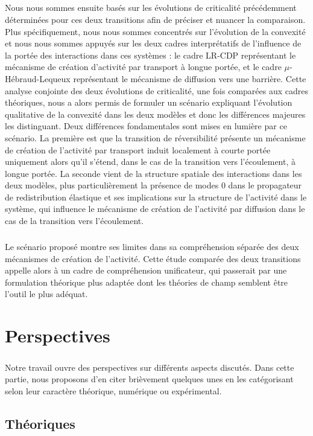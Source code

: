 \subparagraph{}Nous nous sommes ensuite basés sur les évolutions de criticalité précédemment déterminées pour ces deux transitions afin de préciser et nuancer la comparaison. Plus spécifiquement, nous nous sommes concentrés sur l'évolution de la convexité et nous nous sommes appuyés sur les deux cadres interprétatifs de l'influence de la portée des interactions dans ces systèmes : le cadre LR-CDP représentant le mécanisme de création d'activité par transport à longue portée, et le cadre $\mu$-Hébraud-Lequeux représentant le mécanisme de diffusion vers une barrière. Cette analyse conjointe des deux évolutions de criticalité, une fois comparées aux cadres théoriques, nous a alors permis de formuler un scénario expliquant l'évolution qualitative de la convexité dans les deux modèles et donc les différences majeures les distinguant. Deux différences fondamentales sont mises en lumière par ce scénario. La première est que la transition de réversibilité présente un mécanisme de création de l'activité par transport induit localement à courte portée uniquement alors qu'il s'étend, dans le cas de la transition vers l'écoulement, à longue portée. La seconde vient de la structure spatiale des interactions dans les deux modèles, plus particulièrement la présence de modes 0 dans le propagateur de redistribution élastique et ses implications sur la structure de l'activité dans le système, qui influence le mécanisme de création de l'activité par diffusion dans le cas de la transition vers l'écoulement.

\subparagraph{}Le scénario proposé montre ses limites dans sa compréhension séparée des deux mécanismes de création de l'activité. Cette étude comparée des deux transitions appelle alors à un cadre de compréhension unificateur, qui passerait par une formulation théorique plus adaptée dont les théories de champ semblent être l'outil le plus adéquat.

\section*{Perspectives}

\subparagraph{}Notre travail ouvre des perspectives sur différents aspects discutés. Dans cette partie, nous proposons d'en citer brièvement quelques unes en les catégorisant selon leur caractère théorique, numérique ou expérimental.

\subsection*{Théoriques}

